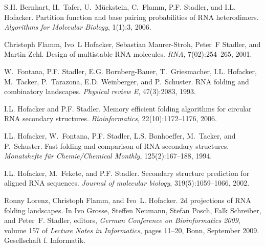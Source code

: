 
\begin{DoxyDescription}
\item[\label{_CITEREF_bernhart:2006}%
\mbox{[}1\mbox{]}]S.\+H. Bernhart, H.~Tafer, U.~M\"{u}ckstein, C.~Flamm, P.\+F. Stadler, and I.\+L. Hofacker. Partition function and base pairing probabilities of R\+N\+A heterodimers. {\itshape Algorithms for Molecular Biology}, 1(1)\+:3, 2006.


\item[\label{_CITEREF_flamm:2001}%
\mbox{[}2\mbox{]}]Christoph Flamm, Ivo~L Hofacker, Sebastian Maurer-\/\+Stroh, Peter~F Stadler, and Martin Zehl. Design of multistable R\+N\+A molecules. {\itshape R\+N\+A}, 7(02)\+:254--265, 2001.


\item[\label{_CITEREF_fontana:1993b}%
\mbox{[}3\mbox{]}]W.~Fontana, P.\+F. Stadler, E.\+G. Bornberg-\/\+Bauer, T.~Griesmacher, I.\+L. Hofacker, M.~Tacker, P.~Tarazona, E.\+D. Weinberger, and P.~Schuster. R\+N\+A folding and combinatory landscapes. {\itshape Physical review E}, 47(3)\+:2083, 1993.


\item[\label{_CITEREF_hofacker:2006}%
\mbox{[}4\mbox{]}]I.\+L. Hofacker and P.\+F. Stadler. Memory efficient folding algorithms for circular R\+N\+A secondary structures. {\itshape Bioinformatics}, 22(10)\+:1172--1176, 2006.


\item[\label{_CITEREF_hofacker:1994}%
\mbox{[}5\mbox{]}]I.\+L. Hofacker, W.~Fontana, P.\+F. Stadler, L.\+S. Bonhoeffer, M.~Tacker, and P.~Schuster. Fast folding and comparison of R\+N\+A secondary structures. {\itshape Monatshefte f\"{u}r Chemie/\+Chemical Monthly}, 125(2)\+:167--188, 1994.


\item[\label{_CITEREF_hofacker:2002}%
\mbox{[}6\mbox{]}]I.\+L. Hofacker, M.~Fekete, and P.\+F. Stadler. Secondary structure prediction for aligned R\+N\+A sequences. {\itshape Journal of molecular biology}, 319(5)\+:1059--1066, 2002.


\item[\label{_CITEREF_lorenz:2009}%
\mbox{[}7\mbox{]}]Ronny Lorenz, Christoph Flamm, and Ivo~L. Hofacker. 2d projections of R\+N\+A folding landscapes. In Ivo Grosse, Steffen Neumann, Stefan Posch, Falk Schreiber, and Peter~F. Stadler, editors, {\itshape German Conference on Bioinformatics 2009}, volume 157 of {\itshape Lecture Notes in Informatics}, pages 11--20, Bonn, September 2009. Gesellschaft f. Informatik.



\end{DoxyDescription}
